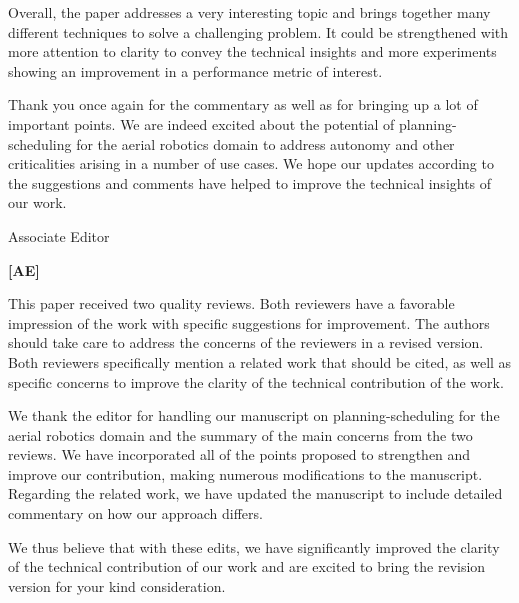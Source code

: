 \documentclass[10pt]{letter}
\begin{document}
Overall, the paper addresses a very interesting topic and brings together many different techniques to solve a challenging problem. It could be strengthened with more attention to clarity to convey the technical insights and more experiments showing an improvement in a performance metric of interest.

{\color{blue} 

{\hspace*{-4.5em}{[R2:12]}\vspace*{-1.9em}}

Thank you once again for the commentary as well as for bringing up a lot of important points. We are indeed excited about the potential of planning-scheduling for the aerial robotics domain to address autonomy and other criticalities arising in a number of use cases. 
We hope our updates according to the suggestions and comments have helped to improve the technical insights of our work.
}

\vspace{1em}



\vspace{2em}







\newpage

{Associate Editor}

\vspace{3em}

{\hspace*{-4.5em}\textbf{[AE]}\vspace*{-1.9em}}

This paper received two quality reviews. Both reviewers have a favorable impression of the work with specific suggestions for improvement. The authors should take care to address the concerns of the reviewers in a revised version. Both reviewers specifically mention a related work that should be cited, as well as specific concerns to improve the clarity of the technical contribution of the work.


{\color{blue}

{\hspace*{-4.5em}{[AE]}\vspace*{-1.9em}}

We thank the editor for handling our manuscript on planning-scheduling for the aerial robotics domain and the summary of the main concerns from the two reviews. 
We have incorporated all of the points proposed to strengthen and improve our contribution, making numerous modifications to the manuscript. Regarding the related work, we have updated the manuscript to include detailed commentary on how our approach differs. 

We thus believe that with these edits, we have significantly improved the clarity of the technical contribution of our work and are excited to bring the revision version for your kind consideration.
}
\end{document}

